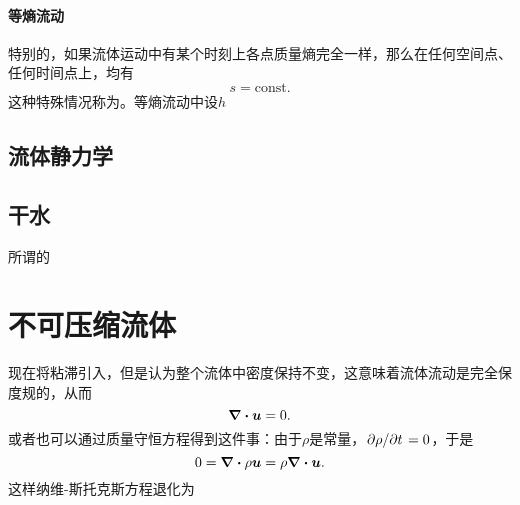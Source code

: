 \subsubsection{等熵流动}

特别的，如果流体运动中有某个时刻上各点质量熵完全一样，那么在任何空间点、任何时间点上，均有
\begin{equation}
    s = \text{const}.
\end{equation}
这种特殊情况称为。等熵流动中设$h$

\section{流体静力学}

\section{干水}\label{sec:dry-water}

所谓的

\chapter{不可压缩流体}

现在将粘滞引入，但是认为整个流体中密度保持不变，这意味着流体流动是完全保度规的，从而
\begin{equation}
    \div{\vb*{u}} = 0.
\end{equation}
或者也可以通过质量守恒方程得到这件事：由于$\rho$是常量，$\pdv*{\rho}{t} = 0$，于是
\[
    0 = \div{\rho \vb*{u}} = \rho \div{\vb*{u}}.
\]
这样纳维-斯托克斯方程退化为